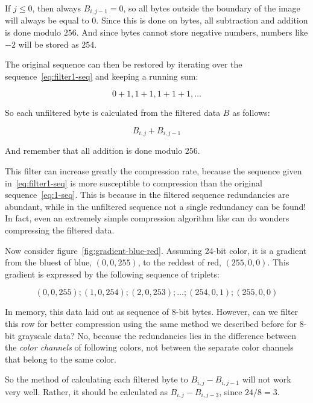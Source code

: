 If $j \le 0$, then always $B_{i,j-1} = 0$, so all bytes outside the
boundary of the image will always be equal to $0$. Since this is done
on bytes, all subtraction and addition is done modulo $256$. And since
bytes cannot store negative numbers, numbers like $-2$ will be stored
as $254$.

The original sequence can then be restored by iterating over the
sequence~\ref{eq:filter1-seq} and keeping a running sum:

\begin{equation*}
  0+1,1+1,1+1+1,\dots
\end{equation*}

So each unfiltered byte is calculated from the filtered data $B$ as
follows:

\begin{equation*}
  B_{i,j} + B_{i,j-1}
\end{equation*}

And remember that all addition is done modulo $256$.

This filter can increase greatly the compression rate, because the
sequence given in~\ref{eq:filter1-seq} is more susceptible to
compression than the original sequence~\ref{eq:1-seq}. This is because
in the filtered sequence redundancies are abundant, while in the
unfiltered sequence not a single redundancy can be found! In fact,
even an extremely simple compression algorithm like \rle can do wonders
compressing the filtered data.

Now consider figure~\ref{fig:gradient-blue-red}. Assuming 24-bit
color, it is a gradient from the bluest of blue, $(0,0,255)$, to the
reddest of red, $(255,0,0)$. This gradient is expressed by the
following sequence of \rgb triplets:

\begin{equation*}
  (0,0,255); (1,0,254); (2,0,253); \dots; (254,0,1); (255,0,0)
\end{equation*}

In memory, this data laid out as sequence of 8-bit bytes. However, can
we filter this row for better compression using the same method we
described before for 8-bit grayscale data? No, because the
redundancies lies in the difference between the \textit{color
  channels} of following colors, not between the separate color
channels that belong to the same color.

So the method of calculating each filtered byte to $B_{i,j} -
B_{i,j-1}$ will not work very well. Rather, it should be calculated as
$B_{i,j} - B_{i,j-3}$, since $24 / 8 = 3$.

